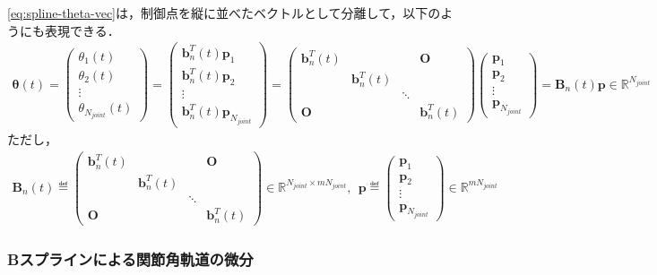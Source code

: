 \eqref{eq:spline-theta-vec}は，制御点を縦に並べたベクトルとして分離して，以下のようにも表現できる．
\begin{eqnarray}
  \bm{\theta}(t) = \begin{pmatrix} \theta_1(t) \\ \theta_2(t) \\ \vdots \\ \theta_{N_{\mathit{joint}}}(t) \end{pmatrix}
  = \begin{pmatrix} \bm{b}_n^T(t) \bm{p}_1 \\  \bm{b}_n^T(t) \bm{p}_2 \\  \vdots \\ \bm{b}_n^T(t) \bm{p}_{N_{\mathit{joint}}} \end{pmatrix}
  = \begin{pmatrix} \bm{b}_n^T(t)&&&\bm{O}\\&\bm{b}_n^T(t)&&\\&&\ddots&\\\bm{O}&&&\bm{b}_n^T(t) \end{pmatrix}
  \begin{pmatrix} \bm{p}_1 \\  \bm{p}_2 \\  \vdots \\ \bm{p}_{N_{\mathit{joint}}} \end{pmatrix}
  = \bm{B}_n(t) \bm{p}
  \in \mathbb{R}^{N_{\mathit{joint}}} \label{eq:spline-theta-vec-2}
\end{eqnarray}
ただし，
\begin{eqnarray}
  \bm{B}_n(t) \eqdef \begin{pmatrix} \bm{b}_n^T(t)&&&\bm{O}\\&\bm{b}_n^T(t)&&\\&&\ddots&\\\bm{O}&&&\bm{b}_n^T(t) \end{pmatrix} \in \mathbb{R}^{N_{\mathit{joint}} \times m N_{\mathit{joint}}}, \ \
  \bm{p} \eqdef \begin{pmatrix} \bm{p}_1 \\  \bm{p}_2 \\  \vdots \\ \bm{p}_{N_{\mathit{joint}}} \end{pmatrix} \in \mathbb{R}^{m N_{\mathit{joint}}}
\end{eqnarray}

\subsubsection*{Bスプラインによる関節角軌道の微分}

